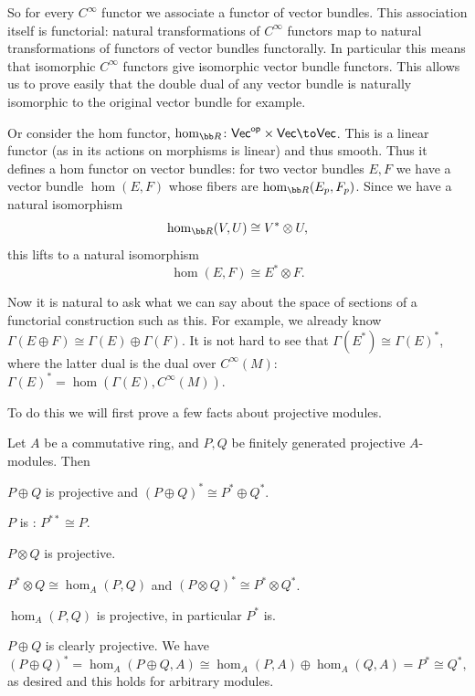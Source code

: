 So for every $C^\infty$ functor we associate a functor of vector bundles.
This association itself is functorial: natural transformations of $C^\infty$ functors map to natural transformations of functors of vector bundles functorally.
In particular this means that isomorphic $C^\infty$ functors give isomorphic vector bundle functors.
This allows us to prove easily that the double dual of any vector bundle is naturally isomorphic to the original vector bundle for example.

Or consider the hom functor, $\hom_\bR\colon\Vec^\op\times\Vec\to\Vec$.
This is a linear functor (as in its actions on morphisms is linear) and thus smooth.
Thus it defines a hom functor on vector bundles: for two vector bundles $E,F$ we have a vector bundle $\hom(E,F)$ whose fibers are $\hom_\bR(E_p,F_p)$.
Since we have a natural isomorphism
$$ \hom_\bR(V,U) \cong V^*\otimes U, $$
this lifts to a natural isomorphism
$$ \hom(E,F) \cong E^*\otimes F . $$

Now it is natural to ask what we can say about the space of sections of a functorial construction such as this.
For example, we already know $\Gamma(E\oplus F)\cong\Gamma(E)\oplus\Gamma(F)$.
It is not hard to see that $\Gamma(E^*)\cong\Gamma(E)^*$, where the latter dual is the dual over $C^\infty(M)$: $\Gamma(E)^*=\hom(\Gamma(E),C^\infty(M))$.

To do this we will first prove a few facts about projective modules.

\blemm

    Let $A$ be a commutative ring, and $P,Q$ be finitely generated projective $A$-modules.
    Then
    \benum
        \item $P\oplus Q$ is projective and $(P\oplus Q)^*\cong P^*\oplus Q^*$.
        \item $P$ is : $P^{**}\cong P$.
        \item $P\otimes Q$ is projective.
        \item $P^*\otimes Q\cong\hom_A(P,Q)$ and $(P\otimes Q)^*\cong P^*\otimes Q^*$.
        \item $\hom_A(P,Q)$ is projective, in particular $P^*$ is.
    \eenum

\elemm

\bproof

    \benum
        \item $P\oplus Q$ is clearly projective.
        We have
        $$ (P\oplus Q)^* = \hom_A(P\oplus Q,A) \cong \hom_A(P,A) \oplus \hom_A(Q,A) = P^* \cong Q^* , $$
        as desired and this holds for arbitrary modules.


